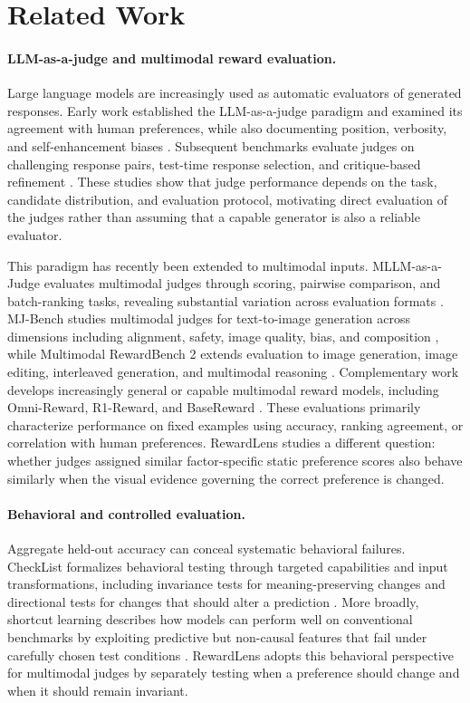 \section{Related Work}

\paragraph{LLM-as-a-judge and multimodal reward evaluation.}
Large language models are increasingly used as automatic evaluators of generated responses. Early work established the LLM-as-a-judge paradigm and examined its agreement with human preferences, while also documenting position, verbosity, and self-enhancement biases \citep{zheng2023judging}. Subsequent benchmarks evaluate judges on challenging response pairs, test-time response selection, and critique-based refinement \citep{tan2025judgebench,zhou2025evaluating}. These studies show that judge performance depends on the task, candidate distribution, and evaluation protocol, motivating direct evaluation of the judges rather than assuming that a capable generator is also a reliable evaluator.

This paradigm has recently been extended to multimodal inputs. MLLM-as-a-Judge evaluates multimodal judges through scoring, pairwise comparison, and batch-ranking tasks, revealing substantial variation across evaluation formats \citep{chen2024mllm}. MJ-Bench studies multimodal judges for text-to-image generation across dimensions including alignment, safety, image quality, bias, and composition \citep{chen2025mjbench}, while Multimodal RewardBench 2 extends evaluation to image generation, image editing, interleaved generation, and multimodal reasoning \citep{hu2026multimodal}. Complementary work develops increasingly general or capable multimodal reward models, including Omni-Reward, R1-Reward, and BaseReward \citep{jin2026omnireward,zhang2026r1reward,zhang2026basereward}. These evaluations primarily characterize performance on fixed examples using accuracy, ranking agreement, or correlation with human preferences. RewardLens studies a different question: whether judges assigned similar factor-specific static preference scores also behave similarly when the visual evidence governing the correct preference is changed.

\paragraph{Behavioral and controlled evaluation.}
Aggregate held-out accuracy can conceal systematic behavioral failures. CheckList formalizes behavioral testing through targeted capabilities and input transformations, including invariance tests for meaning-preserving changes and directional tests for changes that should alter a prediction \citep{ribeiro2020beyond}. More broadly, shortcut learning describes how models can perform well on conventional benchmarks by exploiting predictive but non-causal features that fail under carefully chosen test conditions \citep{geirhos2020shortcut}. RewardLens adopts this behavioral perspective for multimodal judges by separately testing when a preference should change and when it should remain invariant.

